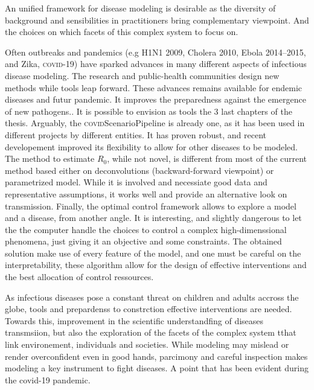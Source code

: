 An unified framework for disease modeling is desirable as the diversity of background and sensibilities in practitioners bring complementary viewpoint. And the choices on which facets of this complex system to focus on. 

Often outbreaks and pandemics (e.g H1N1 2009, Cholera 2010, Ebola 2014--2015, and Zika, \textsc{covid}-19) have sparked advances in many different aspects of infectious disease modeling. The research and public-health communities design new methods while tools leap forward. These advances remains available for endemic diseases and futur pandemic. It improves the preparedness  against the emergence of new pathogens.. It is possible to envision as tools the 3 last chapters of the thesis. Arguably, the \textsc{covid}ScenarioPipeline is already one, as it has been used in different projects by different entities. It has proven robust, and recent developement improved its flexibility to allow for other diseases to be modeled. The method to estimate $R_0$, while not novel, is different from most of the current method based either on deconvolutions (backward-forward viewpoint) or parametrized model. While it is involved and necessiate good data and representative assumptions, it works well and provide an alternative look on transmission.
Finally, the optimal control framework allows to explore a model and a disease, from another angle. It is interesting, and slightly dangerous to let the the computer handle the choices to control a complex high-dimenssional  phenomena, just giving it an objective and some constraints. The obtained solution make use of every feature of the model, and one must be careful on the interpretability, these algorithm allow for the design of effective interventions and the best allocation of control ressources. 

As infectious diseases pose a constant threat on children and adults accross the globe, tools and prepardenss to constrction effective interventions are needed. Towards this, improvement in the scientific understandfing of diseases transmsiion, but also the exploration of the facets of the complex system tthat link environement, individuals and societies. While modeling may mislead or render overconfident even in good hands, parcimony and careful inspection makes modeling a key instrument to fight diseases. A point that has been evident during the covid-19 pandemic.

